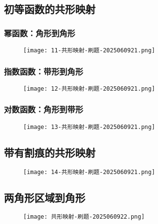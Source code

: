 \subsection{初等函数的共形映射}

\subsubsection{幂函数：角形到角形}

\begin{figure}[H]
\centering
\texttt{[image: 11-共形映射-刷题-2025060921.png]}
\label{}
\end{figure}

\subsubsection{指数函数：带形到角形}

\begin{figure}[H]
\centering
\texttt{[image: 12-共形映射-刷题-2025060921.png]}
\label{}
\end{figure}

\subsubsection{对数函数：角形到带形}

\begin{figure}[H]
\centering
\texttt{[image: 13-共形映射-刷题-2025060921.png]}
\label{}
\end{figure}

\subsection{带有割痕的共形映射}

\begin{figure}[H]
\centering
\texttt{[image: 14-共形映射-刷题-2025060921.png]}
\label{}
\end{figure}

\subsection{两角形区域到角形}

\begin{figure}[H]
\centering
\texttt{[image: 共形映射-刷题-2025060922.png]}
\label{}
\end{figure}

